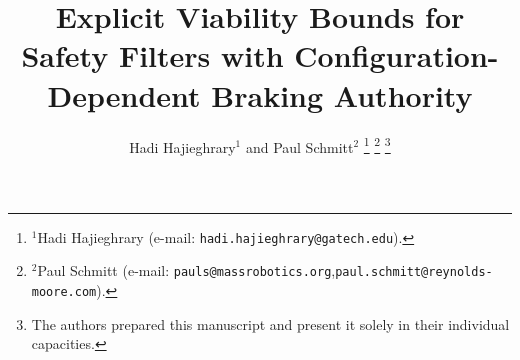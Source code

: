 \documentclass[letterpaper,10pt,conference]{ieeeconf}
\begin{document}
\title{Explicit Viability Bounds for Safety Filters with Configuration-Dependent Braking Authority}

\author{%
Hadi Hajieghrary$^{1}$ and Paul Schmitt$^{2}$%
\thanks{$^{1}$Hadi Hajieghrary (e-mail: \texttt{hadi.hajieghrary@gatech.edu}).}%
\thanks{$^{2}$Paul Schmitt (e-mail: \texttt{pauls@massrobotics.org},\hfil\break \texttt{paul.schmitt@reynolds-moore.com}).}%
\thanks{The authors prepared this manuscript and present it solely in their individual capacities.}%
}

\maketitle

\begin{abstract}


\end{abstract}
\end{document}
